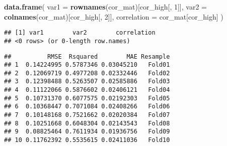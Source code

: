 \documentclass[
  11pt,
]{article}
\newenvironment{Shaded}{\begin{snugshade}}{\end{snugshade}}
\newcommand{\AttributeTok}[1]{\textcolor[rgb]{0.13,0.29,0.53}{#1}}
\newcommand{\ConstantTok}[1]{\textcolor[rgb]{0.56,0.35,0.01}{#1}}
\newcommand{\DecValTok}[1]{\textcolor[rgb]{0.00,0.00,0.81}{#1}}
\newcommand{\FunctionTok}[1]{\textcolor[rgb]{0.13,0.29,0.53}{\textbf{#1}}}
\newcommand{\NormalTok}[1]{#1}
\newcommand{\OtherTok}[1]{\textcolor[rgb]{0.56,0.35,0.01}{#1}}
\newcommand{\SpecialCharTok}[1]{\textcolor[rgb]{0.81,0.36,0.00}{\textbf{#1}}}
\newcommand{\StringTok}[1]{\textcolor[rgb]{0.31,0.60,0.02}{#1}}
\begin{document}
\begin{Shaded}
\begin{Highlighting}[]
\FunctionTok{data.frame}\NormalTok{(}
  \AttributeTok{var1 =} \FunctionTok{rownames}\NormalTok{(cor\_mat)[cor\_high[, }\DecValTok{1}\NormalTok{]],}
  \AttributeTok{var2 =} \FunctionTok{colnames}\NormalTok{(cor\_mat)[cor\_high[, }\DecValTok{2}\NormalTok{]],}
  \AttributeTok{correlation =}\NormalTok{ cor\_mat[cor\_high]}
\NormalTok{)}
\end{Highlighting}
\end{Shaded}

\begin{verbatim}
## [1] var1        var2        correlation
## <0 rows> (or 0-length row.names)
\end{verbatim}

\begin{Shaded}
\end{Shaded}

\begin{verbatim}
##          RMSE  Rsquared        MAE Resample
## 1  0.14224995 0.5787346 0.03045210   Fold01
## 2  0.12069719 0.4977208 0.02332446   Fold02
## 3  0.12398488 0.5263507 0.02585886   Fold03
## 4  0.11122066 0.5876602 0.02406121   Fold04
## 5  0.10731370 0.6077575 0.02192303   Fold05
## 6  0.10368447 0.7071084 0.02408266   Fold06
## 7  0.10148168 0.7521662 0.02020384   Fold07
## 8  0.10251668 0.6048304 0.02143543   Fold08
## 9  0.08825464 0.7611934 0.01936756   Fold09
## 10 0.11762392 0.5535615 0.02411036   Fold10
\end{verbatim}
\end{document}
